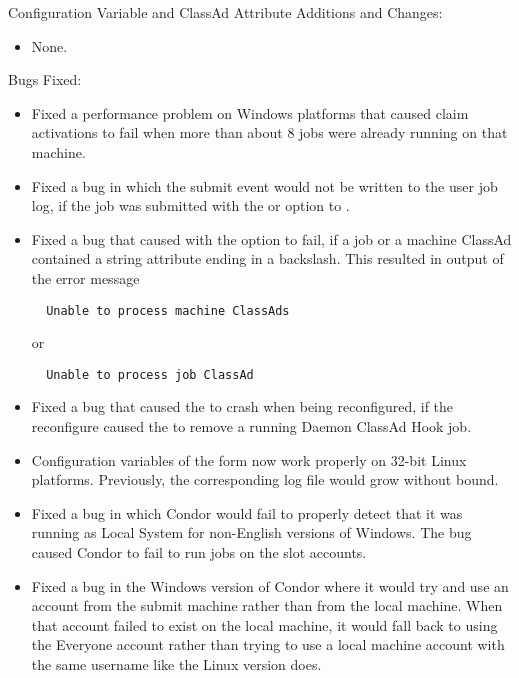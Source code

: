 \noindent Configuration Variable and ClassAd Attribute Additions and Changes:

\begin{itemize}

\item None.

\end{itemize}

\noindent Bugs Fixed:

\begin{itemize}

\item Fixed a performance problem on Windows platforms
that caused claim activations to
fail when more than about 8 jobs were already running on that machine.

\item Fixed a bug in which the submit event would not be written to the user
job log,
if the job was submitted with the  or  option to
.

\item Fixed a bug that caused  with the  option
to fail,
if a job or a machine ClassAd contained a string attribute ending in 
a backslash.
This resulted in output of the error message
\begin{verbatim}
  Unable to process machine ClassAds
\end{verbatim}
or
\begin{verbatim}
  Unable to process job ClassAd
\end{verbatim}

\item Fixed a bug that caused the  to crash when being
reconfigured,
if the reconfigure caused the  to remove 
a running Daemon ClassAd Hook job.

\item Configuration variables of the form 
now work properly on 32-bit Linux platforms.
Previously, the corresponding log file would grow without bound.

\item Fixed a bug in which Condor would fail to properly detect that it 
was running as Local System for non-English versions of Windows.
The bug caused Condor to fail to run jobs on the slot accounts.

\item Fixed a bug in the Windows version of Condor where it would try and use an
account from the submit machine rather than from the local machine.  When that
account failed to exist on the local machine, it would fall back to using the Everyone
account rather than trying to use a local machine account with the same username like
the Linux version does.


\end{itemize}
